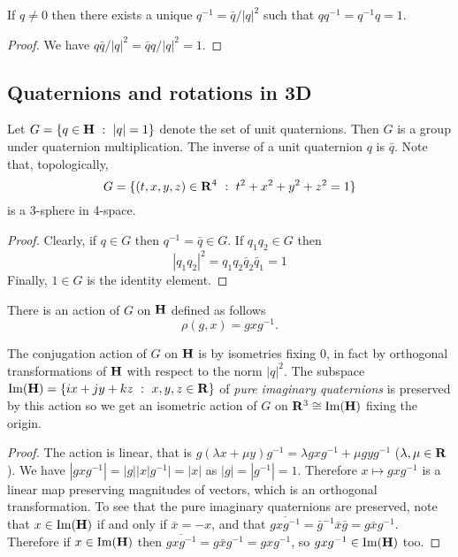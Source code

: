 \documentclass[12pt]{article}
\begin{document}
\begin{lma}
  If $q\neq 0$ then there exists a unique $q^{-1}=\bar{q}/|q|^2$ such that $qq^{-1}=q^{-1}q=1$.
\end{lma}
\begin{proof}
We have $q\bar{q}/|q|^2=\bar{q}q/|q|^2=1$.
\end{proof}

\subsection{Quaternions and rotations in 3D}

\begin{lma}
  Let $G=\{q\in\mathbf{H}\ :\ |q|=1\}$ denote the set of unit quaternions. Then $G$ is a group under quaternion multiplication. The inverse of a unit quaternion $q$ is $\bar{q}$. Note that, topologically,
  \[G=\{(t,x,y,z)\in\RR^4\ :\ t^2+x^2+y^2+z^2=1\}\]
  is a 3-sphere in 4-space.
\end{lma}
\begin{proof}
  Clearly, if $q\in G$ then $q^{-1}=\bar{q}\in G$. If $q_1q_2\in G$ then
  \[|q_1q_2|^2=q_1q_2\bar{q}_2\bar{q}_1=1\]
  Finally, $1\in G$ is the identity element.
\end{proof}

\begin{dfn}
  There is an action of $G$ on $\mathbf{H}$ defined as follows
  \[\rho(g,x)=gxg^{-1}.\]
\end{dfn}

\begin{lma}
The conjugation action of $G$ on $\mathbf{H}$ is by isometries fixing $0$, in fact by orthogonal transformations of $\mathbf{H}$ with respect to the norm $|q|^2$. The subspace $\OP{Im}(\HH)=\{ix+jy+kz\ :\ x,y,z\in\RR\}$ of {\em pure imaginary quaternions} is preserved by this action so we get an isometric action of $G$ on $\mathbf{R}^3\cong\operatorname{Im}(\mathbf{H})$ fixing the origin.
\end{lma}
\begin{proof}
The action is linear, that is $g(\lambda x+\mu y)g^{-1}=\lambda gxg^{-1}+\mu gyg^{-1}$ ($\lambda,\mu\in\mathbf{R}$). We have $|gxg^{-1}|=|g||x|g^{-1}|=|x|$ as $|g|=|g^{-1}|=1$. Therefore $x\mapsto gxg^{-1}$ is a linear map preserving magnitudes of vectors, which is an orthogonal transformation. To see that the pure imaginary quaternions are preserved, note that $x\in\operatorname{Im}(\mathbf{H})$ if and only if $\bar{x}=-x$, and that $\overline{gxg^{-1}}=\bar{g}^{-1}\bar{x}\bar{g}=g\bar{x}g^{-1}$. Therefore if $x\in\operatorname{Im}(\mathbf{H})$ then $\overline{gxg^{-1}}=g\bar{x}g^{-1}=gxg^{-1}$, so $gxg^{-1}\in\operatorname{Im}(\mathbf{H})$ too.
\end{proof}
\end{document}
